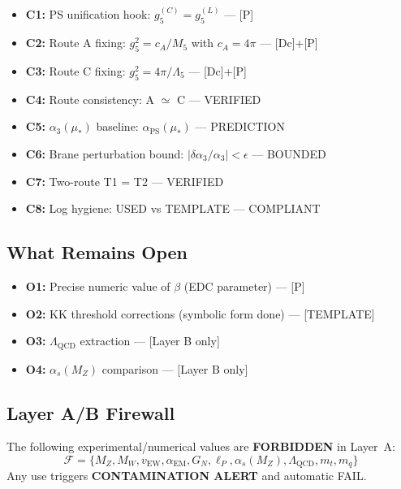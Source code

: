 \documentclass[11pt,a4paper]{article}
\theoremstyle{definition}
\begin{document}
\begin{predictionbox}[CLOSED in v56]
\begin{itemize}
  \item \textbf{C1:} PS unification hook: $g_5^{(C)} = g_5^{(L)}$ --- [P]
  \item \textbf{C2:} Route A fixing: $g_5^2 = c_A/M_5$ with $c_A = 4\pi$ --- [Dc]+[P]
  \item \textbf{C3:} Route C fixing: $g_5^2 = 4\pi/\Lambda_5$ --- [Dc]+[P]
  \item \textbf{C4:} Route consistency: A $\simeq$ C --- VERIFIED
  \item \textbf{C5:} $\alpha_3(\mu_*)$ baseline: $\alpha_{\text{PS}}(\mu_*)$ --- PREDICTION
  \item \textbf{C6:} Brane perturbation bound: $|\delta\alpha_3/\alpha_3| < \epsilon$ --- BOUNDED
  \item \textbf{C7:} Two-route T1 = T2 --- VERIFIED
  \item \textbf{C8:} Log hygiene: USED vs TEMPLATE --- COMPLIANT
\end{itemize}
\end{predictionbox}

\subsection{What Remains Open}
\label{subsec:what-open}

\begin{trapbox}
\begin{itemize}
  \item \textbf{O1:} Precise numeric value of $\beta$ (EDC parameter) --- [P]
  \item \textbf{O2:} KK threshold corrections (symbolic form done) --- [TEMPLATE]
  \item \textbf{O3:} $\Lambda_{\text{QCD}}$ extraction --- [Layer B only]
  \item \textbf{O4:} $\alpha_s(M_Z)$ comparison --- [Layer B only]
\end{itemize}
\end{trapbox}

\subsection{Layer A/B Firewall}
\label{subsec:firewall}

\begin{forbiddenbox}
The following experimental/numerical values are \textbf{FORBIDDEN} in Layer~A:
\begin{equation}
\label{eq:forbidden-list}
\mathcal{F} = \{M_Z, M_W, v_{\text{EW}}, \alpha_{\text{EM}}, G_N, \ell_P,
  \alpha_s(M_Z), \Lambda_{\text{QCD}}, m_t, m_q\}
\end{equation}
Any use triggers \textbf{CONTAMINATION ALERT} and automatic FAIL.
\end{forbiddenbox}
\end{document}

